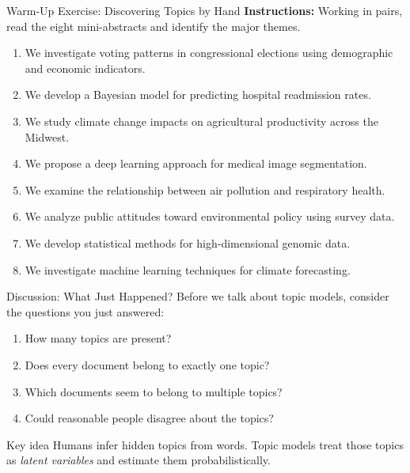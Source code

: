 \documentclass[aspectratio=169]{beamer}
\begin{document}
\begin{frame}{Warm-Up Exercise: Discovering Topics by Hand}
\textbf{Instructions:} Working in pairs, read the eight mini-abstracts and identify the major themes.

\vspace{0.5em}
\small
\begin{enumerate}
  \item We investigate voting patterns in congressional elections using demographic and economic indicators.
  \item We develop a Bayesian model for predicting hospital readmission rates.
  \item We study climate change impacts on agricultural productivity across the Midwest.
  \item We propose a deep learning approach for medical image segmentation.
  \item We examine the relationship between air pollution and respiratory health.
  \item We analyze public attitudes toward environmental policy using survey data.
  \item We develop statistical methods for high-dimensional genomic data.
  \item We investigate machine learning techniques for climate forecasting.
\end{enumerate}
\end{frame}

\begin{frame}{Discussion: What Just Happened?}
Before we talk about topic models, consider the questions you just answered:

\begin{enumerate}
  \item How many topics are present?
  \item Does every document belong to exactly one topic?
  \item Which documents seem to belong to multiple topics?
  \item Could reasonable people disagree about the topics?
\end{enumerate}

\vspace{0.7em}
\pause

\begin{block}{Key idea}
Humans infer hidden topics from words. Topic models treat those topics as \emph{latent variables} and estimate them probabilistically.
\end{block}
\end{frame}
\end{document}
